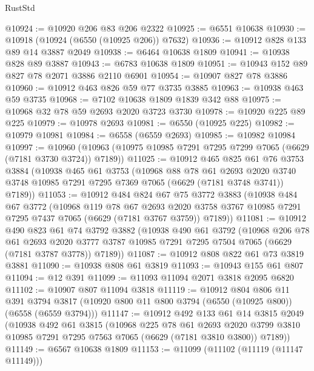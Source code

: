 \begin{lexlean}{RustStd}
\begin{coremodule}
@10924 := @10920 @206 @83 @206 @2322
@10925 := @6551 @10638
@10930 := @10918 (@10924 (@6550 (@10925 @206)) @7632)
@10936 := @10912 @828 @133 @89 @14 @3887 @2049
@10938 := @6464 @10638 @1809
@10941 := @10938 @828 @89 @3887
@10943 := @6783 @10638 @1809
@10951 := @10943 @152 @89 @827 @78 @2071 @3886 @2110 @6901
@10954 := @10907 @827 @78 @3886
@10960 := @10912 @463 @826 @59 @77 @3735 @3885
@10963 := @10938 @463 @59 @3735
@10968 := @7102 @10638 @1809 @1839 @342 @88
@10975 := @10968 @32 @78 @59 @2693 @2020 @3723 @3730
@10978 := @10920 @225 @89 @225
@10979 := @10978 @2693
@10981 := @6550 (@10925 @225)
@10982 := @10979 @10981
@10984 := @6558 (@6559 @2693)
@10985 := @10982 @10984
@10997 := @10960 (@10963 (@10975 @10985 @7291 @7295 @7299 @7065 (@6629 (@7181 @3730 @3724)) @7189))
@11025 := @10912
    @465
    @825
    @61
    @76
    @3753
    @3884
    (@10938
      @465
      @61
      @3753
      (@10968
        @88
        @78
        @61
        @2693
        @2020
        @3740
        @3748
        @10985
        @7291
        @7295
        @7369
        @7065
        (@6629 (@7181 @3748 @3741))
        @7189))
@11053 := @10912
    @484
    @824
    @67
    @75
    @3772
    @3883
    (@10938
      @484
      @67
      @3772
      (@10968
        @119
        @78
        @67
        @2693
        @2020
        @3758
        @3767
        @10985
        @7291
        @7295
        @7437
        @7065
        (@6629 (@7181 @3767 @3759))
        @7189))
@11081 := @10912
    @490
    @823
    @61
    @74
    @3792
    @3882
    (@10938
      @490
      @61
      @3792
      (@10968
        @206
        @78
        @61
        @2693
        @2020
        @3777
        @3787
        @10985
        @7291
        @7295
        @7504
        @7065
        (@6629 (@7181 @3787 @3778))
        @7189))
@11087 := @10912 @808 @822 @61 @73 @3819 @3881
@11090 := @10938 @808 @61 @3819
@11093 := @10943 @155 @61 @807
@11094 := @12 @391
@11099 := @11093 @11094 @2071 @3818 @2095 @6820
@11102 := @10907 @807 @11094 @3818
@11119 := @10912
    @804
    @806
    @11
    @391
    @3794
    @3817
    (@10920 @800 @11 @800 @3794 (@6550 (@10925 @800)) (@6558 (@6559 @3794)))
@11147 := @10912
    @492
    @133
    @61
    @14
    @3815
    @2049
    (@10938
      @492
      @61
      @3815
      (@10968
        @225
        @78
        @61
        @2693
        @2020
        @3799
        @3810
        @10985
        @7291
        @7295
        @7563
        @7065
        (@6629 (@7181 @3810 @3800))
        @7189))
@11149 := @6567 @10638 @1809
@11153 := @11099 (@11102 (@11119 (@11147 @11149)))

\end{coremodule}
\end{lexlean}
